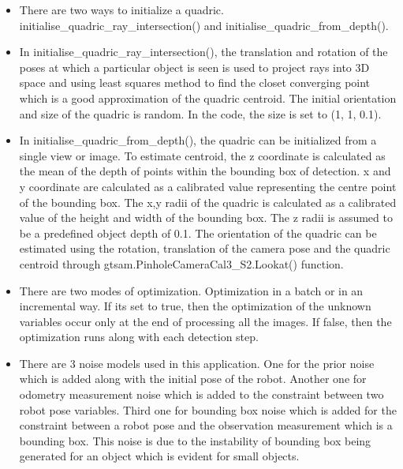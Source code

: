 \documentclass{article}
\begin{document}
\begin{itemize}
\item There are two ways to initialize a quadric. initialise\_quadric\_ray\_intersection() and \newline initialise\_quadric\_from\_depth().
\item In initialise\_quadric\_ray\_intersection(), the translation and rotation of the poses at which a particular object is seen is used to project rays into 3D space and using least squares method to find the closet converging point which is a good approximation of the quadric centroid. The initial orientation and size of the quadric is random. In the code, the size is set to (1, 1, 0.1).
\item In initialise\_quadric\_from\_depth(), the quadric can be initialized from a single view or image. To estimate centroid, the z coordinate is calculated as the mean of the depth of points within the bounding box of detection. x and y coordinate are calculated as a calibrated value representing the centre point of the bounding box. The x,y radii of the quadric is calculated as a calibrated value of the height and width of the bounding box. The z radii is assumed to be a predefined object depth of 0.1. The orientation of the quadric can be estimated using the rotation, translation of the camera pose and the quadric centroid through gtsam.PinholeCameraCal3\_S2.Lookat() function.
\item There are two modes of optimization. Optimization in a batch or in an incremental way. If its set to true, then the optimization of the unknown variables occur only at the end of processing all the images. If false, then the optimization runs along with each detection step.
\item There are 3 noise models used in this application. One for the prior noise which is added along with the initial pose of the robot. Another one for odometry measurement noise which is added to the constraint between two robot pose variables. Third one for bounding box noise which is added for the constraint between a robot pose and the observation measurement which is a bounding box. This noise is due to the instability of bounding box being generated for an object which is evident for small objects.



\end{itemize}
\end{document}
